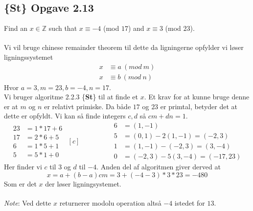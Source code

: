 \documentclass[12pt]{article}
\begin{document}
\subsection*{\{\textbf{St}\} Opgave 2.13}
Find an $x\in \mathbb{Z}$ such that $x\equiv -4$ (mod $17$) and $x\equiv 3$ (mod $23$).\\
\\
Vi vil bruge chinese remainder theorem til dette da ligningerne opfylder vi løser ligningssystemet
\begin{align*}
x&\equiv a\: (mod\:m) \\
x&\equiv b\: (mod\:n)
\end{align*}
Hvor $a=3,m=23,b=-4,n=17$.\\
Vi bruger algoritme 2.2.3 \{\textbf{St}\} til at finde et $x$. Et krav for at kunne bruge denne er at $m$ og $n$ er relativt primiske. Da både $17$ og $23$ er primtal, betyder det at dette er opfyldt. Vi kan så finde integers $c,d$ så $cm+dn=1$.
\begin{equation*}
\begin{aligned}
23&=1*17+6 \\
17&=2*6+5 \\
6&=1*5+1 \\
5&=5*1+0
\end{aligned}
\begin{aligned}[c]
\;\;\;\;\;\;\;\;\;\;\;\;\;\;\;
\end{aligned}
\begin{aligned}
6&=(1,-1) \\
5&=(0,1)-2(1,-1)=(-2,3) \\
1&=(1,-1)-(-2,3)=(3,-4) \\
0&=(-2,3)-5(3,-4)=(-17,23)
\end{aligned}
\end{equation*}
Her finder vi $c$ til $3$ og $d$ til $-4$. Anden del af algoritmen giver derved at 
$$x=a+(b-a)cm=3+(-4-3)*3*23=-480$$
Som er det $x$ der løser ligningsystemet.\\
\\
\textit{Note}: Ved dette $x$ returnerer modolu operation altså $-4$ istedet for $13$.
\end{document}
